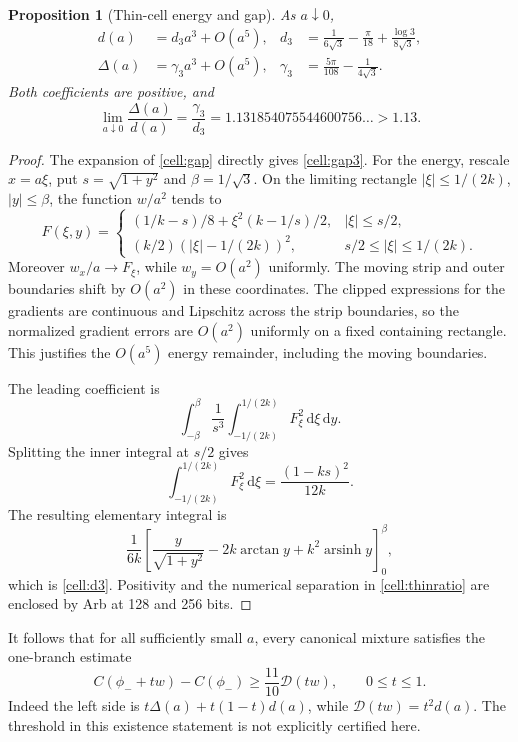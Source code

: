 \documentclass[11pt]{article}
\newtheorem{proposition}[theorem]{Proposition}
\theoremstyle{remark}\newtheorem{remark}[theorem]{Remark}
\newcommand{\dd}{\,\mathrm d}
\newcommand{\Dir}{\mathcal D}
\begin{document}
\begin{proposition}[Thin-cell energy and gap]\label{cell:thinasymptotic}
As $a\downarrow0$,
\begin{align}
 d(a)&=d_3a^3+O(a^5),&
 d_3&=\frac1{6\sqrt3}-\frac\pi{18}+\frac{\log3}{8\sqrt3},\label{cell:d3}\\
 \Delta(a)&=\gamma_3a^3+O(a^5),&
 \gamma_3&=\frac{5\pi}{108}-\frac1{4\sqrt3}.\label{cell:gap3}
\end{align}
Both coefficients are positive, and
\begin{equation}\label{cell:thinratio}
 \lim_{a\downarrow0}\frac{\Delta(a)}{d(a)}
 =\frac{\gamma_3}{d_3}=1.131854075544600756\ldots>1.13.
\end{equation}
\end{proposition}
\begin{proof}
The expansion of \eqref{cell:gap} directly gives \eqref{cell:gap3}. For the energy, rescale $x=a\xi$, put $s=\sqrt{1+y^2}$ and $\beta=1/\sqrt3$. On the limiting rectangle
$|\xi|\leq1/(2k)$, $|y|\leq\beta$, the function $w/a^2$ tends to
\[
 F(\xi,y)=\begin{cases}
 (1/k-s)/8+\xi^2(k-1/s)/2,&|\xi|\leq s/2,\\
 (k/2)(|\xi|-1/(2k))^2,&s/2\leq|\xi|\leq1/(2k).
 \end{cases}
\]
Moreover $w_x/a\to F_\xi$, while $w_y=O(a^2)$ uniformly. The moving strip and outer boundaries shift by $O(a^2)$ in these coordinates. The clipped expressions for the gradients are continuous and Lipschitz across the strip boundaries, so the normalized gradient errors are $O(a^2)$ uniformly on a fixed containing rectangle. This justifies the $O(a^5)$ energy remainder, including the moving boundaries.

The leading coefficient is
\[
 \int_{-\beta}^{\beta}\frac1{s^3}
 \int_{-1/(2k)}^{1/(2k)}F_\xi^2\dd\xi\dd y.
\]
Splitting the inner integral at $s/2$ gives
\[
 \int_{-1/(2k)}^{1/(2k)}F_\xi^2\dd\xi
 =\frac{(1-ks)^2}{12k}.
\]
The resulting elementary integral is
\[
 \frac1{6k}\left[\frac{y}{\sqrt{1+y^2}}-2k\arctan y
                  +k^2\operatorname{arsinh}y\right]_0^\beta,
\]
which is \eqref{cell:d3}. Positivity and the numerical separation in \eqref{cell:thinratio} are enclosed by Arb at 128 and 256 bits.
\end{proof}
It follows that for all sufficiently small $a$, every canonical mixture satisfies the one-branch estimate
\begin{equation}\label{cell:thincoercive}
 C(\phi_-+t w)-C(\phi_-)\geq\frac{11}{10}\Dir(tw),
 \qquad0\leq t\leq1.
\end{equation}
Indeed the left side is $t\Delta(a)+t(1-t)d(a)$, while $\Dir(tw)=t^2d(a)$. The threshold in this existence statement is not explicitly certified here.
\end{document}
